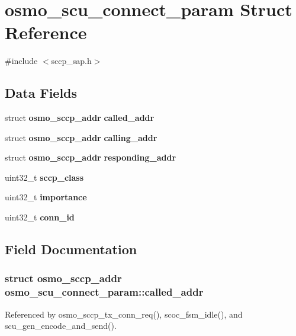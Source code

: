 \section{osmo\+\_\+scu\+\_\+connect\+\_\+param Struct Reference}
\label{structosmo__scu__connect__param}


{\ttfamily \#include $<$sccp\+\_\+sap.\+h$>$}

\subsection*{Data Fields}
\begin{DoxyCompactItemize}
\item 
struct {\bf osmo\+\_\+sccp\+\_\+addr} {\bf called\+\_\+addr}
\item 
struct {\bf osmo\+\_\+sccp\+\_\+addr} {\bf calling\+\_\+addr}
\item 
struct {\bf osmo\+\_\+sccp\+\_\+addr} {\bf responding\+\_\+addr}
\item 
uint32\+\_\+t {\bf sccp\+\_\+class}
\item 
uint32\+\_\+t {\bf importance}
\item 
uint32\+\_\+t {\bf conn\+\_\+id}
\end{DoxyCompactItemize}


\subsection{Field Documentation}
\subsubsection[{called\+\_\+addr}]{\setlength{\rightskip}{0pt plus 5cm}struct {\bf osmo\+\_\+sccp\+\_\+addr} osmo\+\_\+scu\+\_\+connect\+\_\+param\+::called\+\_\+addr}\label{structosmo__scu__connect__param_a8f9c1dd5cfe8d47e1f19bf8203806917}


Referenced by osmo\+\_\+sccp\+\_\+tx\+\_\+conn\+\_\+req(), scoc\+\_\+fsm\+\_\+idle(), and scu\+\_\+gen\+\_\+encode\+\_\+and\+\_\+send().

